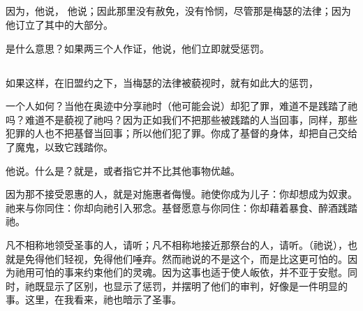 
\subsection{}

因为，他说，   他说；因此那里没有赦免，没有怜悯，尽管那是梅瑟的法律；因为他订立了其中的大部分。\par

是什么意思？如果两三个人作证，他说，他们立即就受惩罚。\par


\subsection{}

如果这样，在旧盟约之下，当梅瑟的法律被藐视时，就有如此大的惩罚， \par

一个人如何？当他在奥迹中分享祂时（他可能会说）却犯了罪，难道不是践踏了祂吗？难道不是藐视了祂吗？因为正如我们不把那些被践踏的人当回事，同样，那些犯罪的人也不把基督当回事；所以他们犯了罪。你成了基督的身体，却把自己交给了魔鬼，以致它践踏你。\par

 他说。什么是？就是，或者指它并不比其他事物优越。\par

 因为那不接受恩惠的人，就是对施惠者侮慢。祂使你成为儿子：你却想成为奴隶。祂来与你同住：你却向祂引入邪念。基督愿意与你同住：你却藉着暴食、醉酒践踏祂。\par

凡不相称地领受圣事的人，请听；凡不相称地接近那祭台的人，请听。（祂说），也就是免得他们轻视，免得他们唾弃。然而祂说的不是这个，而是比这更可怕的。因为祂用可怕的事来约束他们的灵魂。因为这事也适于使人皈依，并不亚于安慰。同时，祂既显示了区别，也显示了惩罚，并摆明了他们的审判，好像是一件明显的事。这里，在我看来，祂也暗示了圣事。\par

